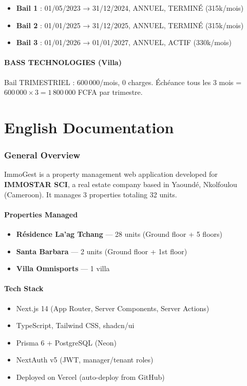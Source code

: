 \documentclass[a4paper,11pt]{article}
\begin{document}
\begin{itemize}
  \item \textbf{Bail 1} : 01/05/2023 → 31/12/2024, ANNUEL, TERMINÉ (315k/mois)
  \item \textbf{Bail 2} : 01/01/2025 → 31/12/2025, ANNUEL, TERMINÉ (315k/mois)
  \item \textbf{Bail 3} : 01/01/2026 → 01/01/2027, ANNUEL, ACTIF (330k/mois)
\end{itemize}

\subsection{BASS TECHNOLOGIES (Villa)}

Bail TRIMESTRIEL : 600\,000/mois, 0 charges. Échéance tous les 3 mois = $600\,000 \times 3 = 1\,800\,000$ FCFA par trimestre.

\newpage
{}
\part{English Documentation}

\section{General Overview}

ImmoGest is a property management web application developed for \textbf{IMMOSTAR SCI}, a real estate company based in Yaoundé, Nkolfoulou (Cameroon). It manages 3 properties totaling 32 units.

\subsection{Properties Managed}
\begin{itemize}
  \item \textbf{Résidence La'ag Tchang} — 28 units (Ground floor + 5 floors)
  \item \textbf{Santa Barbara} — 2 units (Ground floor + 1st floor)
  \item \textbf{Villa Omnisports} — 1 villa
\end{itemize}

\subsection{Tech Stack}
\begin{itemize}
  \item Next.js 14 (App Router, Server Components, Server Actions)
  \item TypeScript, Tailwind CSS, shadcn/ui
  \item Prisma 6 + PostgreSQL (Neon)
  \item NextAuth v5 (JWT, manager/tenant roles)
  \item Deployed on Vercel (auto-deploy from GitHub)
\end{itemize}
\end{document}
